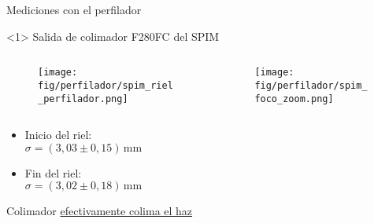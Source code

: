 \begin{frame}{Mediciones con el perfilador}

\begin{onlyenv}<1>
Salida de colimador F280FC del SPIM
\begin{columns}[t]
\begin{column}{0.5\textwidth}
    \begin{figure}[H]
    \centering
    \texttt{[image: fig/perfilador/spim\_riel\_perfilador.png]}
    \label{fig:spim_riel_perfilador}
    \end{figure}
\end{column}
%
    \begin{column}{0.5\textwidth}
        \vspace{-2em}
        \begin{figure}[H]
            \centering
            \texttt{[image: fig/perfilador/spim\_foco\_zoom.png]}
            \label{fig:spim_foco_zoom}
        \end{figure}
        \vspace{-1em}
        
    
    \end{column}
    
\end{columns}

    \begin{itemize}
            \item Inicio del riel:\\ $\sigma = (3,03 \pm 0,15)\,\text{mm}$
            \item Fin del riel:\\ $\sigma = (3,02 \pm 0,18)\,\text{mm}$
    \end{itemize}
    Colimador \underline{efectivamente colima el haz}
\end{onlyenv}



\end{frame}

